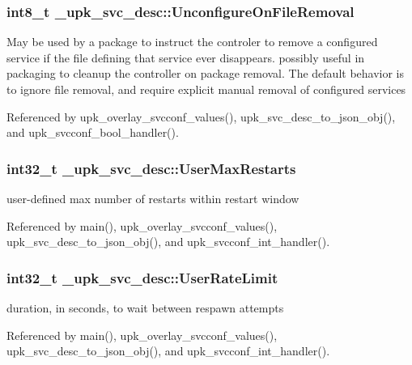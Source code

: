 \subsubsection[{UnconfigureOnFileRemoval}]{\setlength{\rightskip}{0pt plus 5cm}int8\_\-t {\bf \_\-upk\_\-svc\_\-desc::UnconfigureOnFileRemoval}}\label{struct__upk__svc__desc_a16219aee7c0f81d81eaa8a6899e38714}
May be used by a package to instruct the controler to remove a configured service if the file defining that service ever disappears. possibly useful in packaging to cleanup the controller on package removal. The default behavior is to ignore file removal, and require explicit manual removal of configured services 

Referenced by upk\_\-overlay\_\-svcconf\_\-values(), upk\_\-svc\_\-desc\_\-to\_\-json\_\-obj(), and upk\_\-svcconf\_\-bool\_\-handler().

\subsubsection[{UserMaxRestarts}]{\setlength{\rightskip}{0pt plus 5cm}int32\_\-t {\bf \_\-upk\_\-svc\_\-desc::UserMaxRestarts}}\label{struct__upk__svc__desc_adc59ece6c494206a03d7e4a032e7eb34}
user-\/defined max number of restarts within restart window 

Referenced by main(), upk\_\-overlay\_\-svcconf\_\-values(), upk\_\-svc\_\-desc\_\-to\_\-json\_\-obj(), and upk\_\-svcconf\_\-int\_\-handler().

\subsubsection[{UserRateLimit}]{\setlength{\rightskip}{0pt plus 5cm}int32\_\-t {\bf \_\-upk\_\-svc\_\-desc::UserRateLimit}}\label{struct__upk__svc__desc_afe1ca494932eb02304d2f0d4753eda33}
duration, in seconds, to wait between respawn attempts 

Referenced by main(), upk\_\-overlay\_\-svcconf\_\-values(), upk\_\-svc\_\-desc\_\-to\_\-json\_\-obj(), and upk\_\-svcconf\_\-int\_\-handler().

